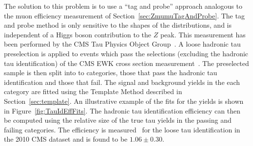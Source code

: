 The solution to this problem is to use a ``tag and probe'' approach analogous to
the muon efficiency measurement of Section~\ref{sec:ZmumuTagAndProbe}.  The tag
and probe method is only sensitive to the shapes of the distributions, and is
independent of a Higgs boson contribution to the $Z$ peak.  This measurement has been
performed by the CMS Tau Physics Object Group~\cite{CMS-PAS-TAU-11-001}.  A
loose hadronic tau preselection is applied to events which pass the selections
(excluding the hadronic tau identification) of the CMS EWK \ZTT cross section
measurement~\cite{CMS-PAS-EWK-10-013}.  The preselected sample is then split
into to categories, those that pass the hadronic tau identification and those
that fail.  The signal and background yields in the each category are fitted
using the Template Method described in Section~\ref{sec:template}.  An
illustrative example of the fits for the yields is shown in
Figure~\ref{fig:TauIdEffFits}.  The hadronic tau identification efficiency can
then be computed using the relative size of the true tau yields in the passing
and failing categories.  The efficiency is measured~\cite{CMS-PAS-TAU-11-001}
for the loose \hpsTanc tau identification in the 2010 CMS dataset and is found
to be \mbox{$1.06 \pm 0.30$}. 
%
